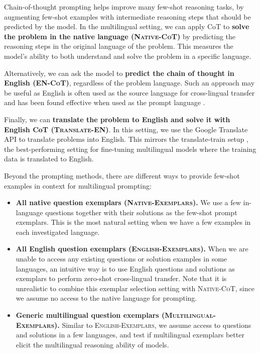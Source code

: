 Chain-of-thought \citep[\textsc{CoT};][]{wei2022chain} prompting helps improve many few-shot reasoning tasks, by augmenting few-shot examples with intermediate reasoning steps that should be predicted by the model. In the multilingual setting, we can apply CoT to \textbf{solve the problem in the native language (\textsc{Native-CoT})} by predicting the reasoning steps in the original language of the problem. This measures the model's ability to both understand and solve the problem in a specific language.

Alternatively, we can ask the model to \textbf{predict the chain of thought in English (\textsc{EN-CoT})}, regardless of the problem language. Such an approach may be useful as English is often used as the source language for cross-lingual transfer \citep{hu2020xtreme} and has been found effective when used as the prompt language \citep{Zhao2021,Winata2021,Lin2021}.

Finally, we can \textbf{translate the problem to English and solve it with English CoT (\textsc{Translate-EN})}. 
In this setting, we use the Google Translate API to translate problems into English. This mirrors the translate-train setup \citep{hu2020xtreme,xue-etal-2021-mt5,ruder-etal-2021-xtreme}, the best-performing setting for fine-tuning multilingual models where the training data is translated to English. 

Beyond the prompting methods, there are different ways to provide few-shot examples in context for multilingual prompting:

\begin{itemize}[leftmargin=*]

\item \textbf{All native question exemplars (\textsc{Native-Exemplars}).} We use a few in-language questions together with their solutions as the few-shot prompt exemplars. This is the most natural setting when we have a few examples in each investigated language.

\item \textbf{All English question exemplars (\textsc{English-Exemplars}).} When we are unable to access any existing questions or solution examples in some languages, an intuitive way is to use English questions and solutions as exemplars to perform zero-shot cross-lingual transfer. Note that it is unrealistic to combine this exemplar selection setting with \textsc{Native-CoT}, since we assume no access to the native language for prompting. 

\item \textbf{Generic multilingual question exemplars (\textsc{Multilingual-Exemplars}).} Similar to \textsc{English-Exemplars}, we assume access to questions and solutions in a few languages, and test if multilingual exemplars better elicit the multilingual reasoning ability of models.

\end{itemize}

